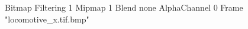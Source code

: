 {Bitmap
	{Filtering 1}
	{Mipmap 1}
	{Blend none}
	{AlphaChannel 0}
	{Frame "locomotive_x.tif.bmp"}
}

